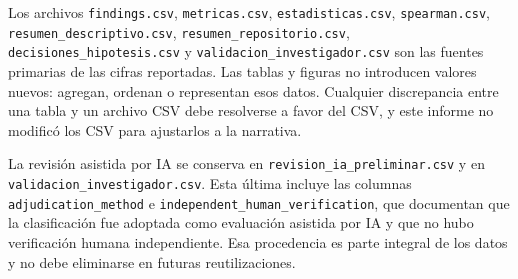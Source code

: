 Los archivos \texttt{findings.csv}, \texttt{metricas.csv}, \texttt{estadisticas.csv}, \texttt{spearman.csv}, \texttt{resumen\_descriptivo.csv}, \texttt{resumen\_repositorio.csv}, \texttt{decisiones\_hipotesis.csv} y \texttt{validacion\_investigador.csv} son las fuentes primarias de las cifras reportadas. Las tablas y figuras no introducen valores nuevos: agregan, ordenan o representan esos datos. Cualquier discrepancia entre una tabla y un archivo CSV debe resolverse a favor del CSV, y este informe no modificó los CSV para ajustarlos a la narrativa.

La revisión asistida por IA se conserva en \texttt{revision\_ia\_preliminar.csv} y en \texttt{validacion\_investigador.csv}. Esta última incluye las columnas \texttt{adjudication\_method} e \texttt{independent\_human\_verification}, que documentan que la clasificación fue adoptada como evaluación asistida por IA y que no hubo verificación humana independiente. Esa procedencia es parte integral de los datos y no debe eliminarse en futuras reutilizaciones.
